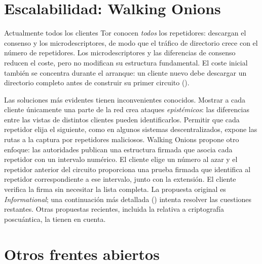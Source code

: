 \section{Escalabilidad: Walking Onions}\label{sec:fut-walking}

Actualmente todos los clientes Tor conocen \emph{todos} los repetidores: descargan el consenso y los microdescriptores, de modo que el tráfico de directorio crece con el número de repetidores. Los microdescriptores y las diferencias de consenso reducen el coste, pero no modifican su estructura fundamental. El coste inicial también se concentra durante el arranque: un cliente nuevo debe descargar un directorio completo antes de construir su primer circuito ().

Las soluciones más evidentes tienen inconvenientes conocidos. Mostrar a cada cliente únicamente una parte de la red crea ataques \emph{epistémicos}: las diferencias entre las vistas de distintos clientes pueden identificarlos. Permitir que cada repetidor elija el siguiente, como en algunos sistemas descentralizados, expone las rutas a la captura por repetidores maliciosos. Walking Onions propone otro enfoque: las autoridades publican una estructura firmada que asocia cada repetidor con un intervalo numérico. El cliente elige un número al azar y el repetidor anterior del circuito proporciona una prueba firmada que identifica al repetidor correspondiente a ese intervalo, junto con la extensión. El cliente verifica la firma sin necesitar la lista completa. La propuesta original es \emph{Informational}; una continuación más detallada () intenta resolver las cuestiones restantes. Otras propuestas recientes, incluida la relativa a criptografía poscuántica, la tienen en cuenta.

\section{Otros frentes abiertos}\label{sec:fut-altri}

